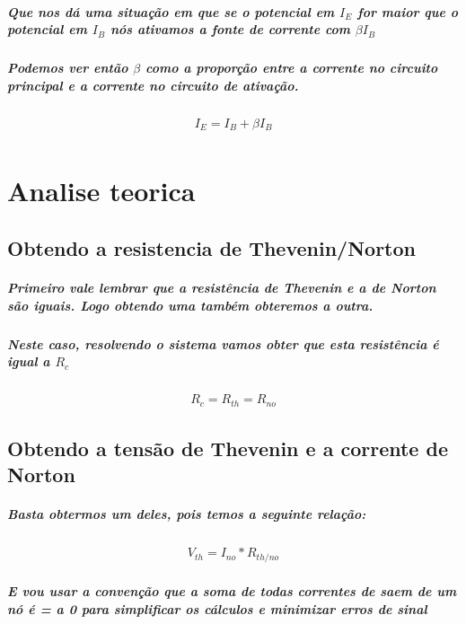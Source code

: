 \documentclass[12pt,twoside, a4paper, twocolumn]{article}
\begin{document}
\subparagraph*{Que nos dá uma situação em que se o potencial em $I_E$ for maior que o potencial em $I_B$  nós ativamos a fonte de corrente com $\beta I_B$}

\subparagraph*{Podemos ver então $\beta$ como a proporção entre a corrente no circuito principal e a corrente no circuito de ativação.}



\begin{equation}
    \begin{aligned}
        I_E = I_B + \beta I_B \\
    \end{aligned}
\end{equation}

\section{Analise teorica}

\subsection{Obtendo a resistencia de Thevenin/Norton}


\subparagraph*{Primeiro vale lembrar que a resistência de Thevenin e a de Norton são iguais. Logo obtendo uma também obteremos a outra.
}

\subparagraph*{Neste caso, resolvendo o sistema vamos obter que esta resistência é igual a $R_{c}$}

\begin{equation}
    \begin{aligned}
        R_c = R_{th} = R_{no}
    \end{aligned}
\end{equation}

\subsection{Obtendo a tensão de Thevenin e a corrente de Norton}

\subparagraph*{Basta obtermos um deles, pois temos a seguinte relação:}

\begin{equation}
    \begin{aligned}
        V_{th} = I_{no} * R_{th/no}
    \end{aligned}
\end{equation}

\subparagraph*{E vou usar a convenção que a soma de todas correntes de saem de um nó é = a 0 para simplificar os cálculos e minimizar erros de sinal}
\end{document}
